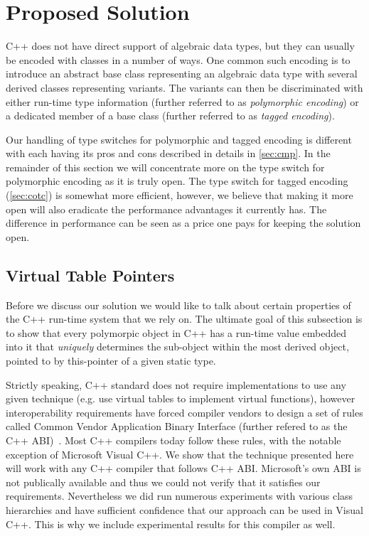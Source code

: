 \section{Proposed Solution}
\label{sec:copc}

C++ does not have direct support of algebraic data types, but they can usually 
be encoded with classes in a number of ways. One common such encoding is to 
introduce an abstract base class representing an algebraic data type with 
several derived classes representing variants. The variants can then be 
discriminated with either run-time type information (further referred to as 
\emph{polymorphic encoding}) or a dedicated member of a base class (further 
referred to as \emph{tagged encoding}).

Our handling of type switches for polymorphic and tagged encoding is different 
with each having its pros and cons described in details in \textsection\ref{sec:cmp}.
In the remainder of this section we will concentrate more on the type switch for 
polymorphic encoding as it is truly open. The type switch for tagged encoding 
(\textsection\ref{sec:cotc}) is somewhat more efficient, however, we believe 
that making it more open will also eradicate the performance advantages it 
currently has. The difference in performance can be seen as a price one pays for 
keeping the solution open.

\subsection{Virtual Table Pointers}
\label{sec:vtp}

Before we discuss our solution we would like to talk about certain properties of 
the C++ run-time system that we rely on. The ultimate goal of this subsection is 
to show that every polymorpic object in C++ has a run-time value embedded into 
it that \emph{uniquely} determines the sub-object within the most derived object, 
pointed to by this-pointer of a given static type.

Strictly speaking, C++ standard does not require implementations to use any 
given technique (e.g. use virtual tables to implement virtual functions), 
however interoperability requirements have forced compiler vendors to design a 
set of rules called Common Vendor Application Binary Interface (further refered 
to as the C++ ABI)~\cite{C++ABI}. Most C++ compilers today follow these rules, 
with the notable exception of Microsoft Visual C++. We show that the technique 
presented here will work with any C++ compiler that follows C++ ABI. Microsoft's 
own ABI is not publically available and thus we could not verify that it satisfies 
our requirements. Nevertheless we did run numerous experiments with various 
class hierarchies and have sufficient confidence that our approach can be used 
in Visual C++. This is why we include experimental results for this compiler as 
well.

